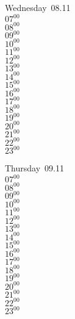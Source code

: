 \documentclass[11pt, a4paper]{book}\usepackage[]{graphicx}\usepackage[]{color}
\begin{document}
\begin{weekdaybox}
  Wednesday~08.11\\
  { 
  \vfill
  $07^{00}$\\
$08^{00}$\\
$09^{00}$\\
$10^{00}$\\
$11^{00}$\\
$12^{00}$\\
$13^{00}$\\
$14^{00}$\\
$15^{00}$\\
$16^{00}$\\
$17^{00}$\\
$18^{00}$\\
$19^{00}$\\
$20^{00}$\\
$21^{00}$\\
$22^{00}$\\
$23^{00}$\\
  }
\end{weekdaybox}
\clearpage
\begin{headerbox}
\end{headerbox}
\begin{weekdaybox}
  Thursday~09.11\\
  { 
  \vfill
  $07^{00}$\\
$08^{00}$\\
$09^{00}$\\
$10^{00}$\\
$11^{00}$\\
$12^{00}$\\
$13^{00}$\\
$14^{00}$\\
$15^{00}$\\
$16^{00}$\\
$17^{00}$\\
$18^{00}$\\
$19^{00}$\\
$20^{00}$\\
$21^{00}$\\
$22^{00}$\\
$23^{00}$\\
  }
\end{weekdaybox} 
\end{document}
